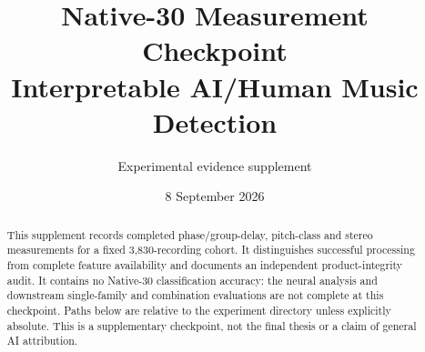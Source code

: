 \documentclass[11pt,a4paper]{article}
\title{Native-30 Measurement Checkpoint\\\large Interpretable AI/Human Music Detection}
\author{Experimental evidence supplement}
\date{8 September 2026}
\begin{document}
\maketitle
\begin{abstract}
This supplement records completed phase/group-delay, pitch-class and stereo
measurements for a fixed 3,830-recording cohort. It distinguishes successful
processing from complete feature availability and documents an independent
product-integrity audit. It contains no Native-30 classification accuracy:
the neural analysis and downstream single-family and combination evaluations
are not complete at this checkpoint. Paths below are relative to the
 experiment directory
unless explicitly absolute. This is a supplementary checkpoint, not the final
thesis or a claim of general AI attribution.
\end{abstract}

\end{document}
